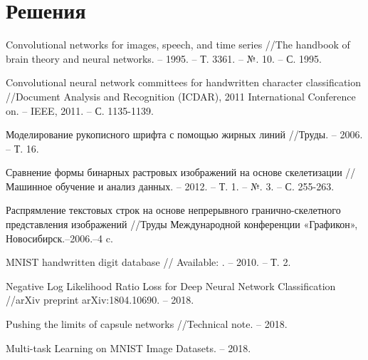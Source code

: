 \documentclass{llncs}
\begin{document}
\section{Решения}


\begin{thebibliography}{1}

	 Convolutional networks for images, speech, and time series //The handbook of brain theory and neural networks. – 1995. – Т. 3361. – №. 10. – С. 1995.
	 
 	Convolutional neural network committees for handwritten character classification //Document Analysis and Recognition (ICDAR), 2011 International Conference on. – IEEE, 2011. – С. 1135-1139.
 
	 Моделирование рукописного шрифта с помощью жирных линий //Труды. – 2006. – Т. 16.

	 Сравнение формы бинарных растровых изображений на основе скелетизации //Машинное обучение и анализ данных. – 2012. – Т. 1. – №. 3. – С. 255-263.
	 
	 Распрямление текстовых строк на основе непрерывного гранично-скелетного представления изображений //Труды Международной конференции «Графикон», Новосибирск.–2006.–4 c.

	MNIST handwritten digit database //
	Available: 
	 . – 2010. – Т. 2.

	 Negative Log Likelihood Ratio Loss for Deep Neural Network Classification //arXiv preprint arXiv:1804.10690. – 2018.
	 
	Pushing the limits of capsule networks //Technical note. – 2018.

	 Multi-task Learning on MNIST Image Datasets. – 2018.

\end{thebibliography}
\end{document}
